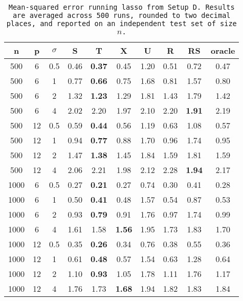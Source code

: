 \begin{table}[ht]
\centering
\begin{tabular}{cccccccccc}
  \hline
n & p & $\sigma$ & S & T & X & U & R & RS & oracle \\ 
  \hline
500 & 6 & 0.5 & 0.46 & \bf 0.37 & 0.45 & 1.20 & 0.51 & 0.72 & 0.47 \\ 
  500 & 6 & 1 & 0.77 & \bf 0.66 & 0.75 & 1.68 & 0.81 & 1.57 & 0.80 \\ 
  500 & 6 & 2 & 1.32 & \bf 1.23 & 1.29 & 1.81 & 1.43 & 1.79 & 1.42 \\ 
  500 & 6 & 4 & 2.02 & 2.20 & 1.97 & 2.10 & 2.20 & \bf 1.91 & 2.19 \\ 
  500 & 12 & 0.5 & 0.59 & \bf 0.44 & 0.56 & 1.19 & 0.63 & 1.08 & 0.57 \\ 
  500 & 12 & 1 & 0.94 & \bf 0.77 & 0.88 & 1.70 & 0.96 & 1.74 & 0.95 \\ 
  500 & 12 & 2 & 1.47 & \bf 1.38 & 1.45 & 1.84 & 1.59 & 1.81 & 1.59 \\ 
  500 & 12 & 4 & 2.06 & 2.21 & 1.98 & 2.12 & 2.28 & \bf 1.94 & 2.17 \\ 
  1000 & 6 & 0.5 & 0.27 & \bf 0.21 & 0.27 & 0.74 & 0.30 & 0.41 & 0.28 \\ 
  1000 & 6 & 1 & 0.50 & \bf 0.41 & 0.48 & 1.57 & 0.54 & 0.87 & 0.53 \\ 
  1000 & 6 & 2 & 0.93 & \bf 0.79 & 0.91 & 1.76 & 0.97 & 1.74 & 0.99 \\ 
  1000 & 6 & 4 & 1.61 & 1.58 & \bf 1.56 & 1.95 & 1.73 & 1.83 & 1.70 \\ 
  1000 & 12 & 0.5 & 0.35 & \bf 0.26 & 0.34 & 0.76 & 0.38 & 0.55 & 0.36 \\ 
  1000 & 12 & 1 & 0.61 & \bf 0.48 & 0.57 & 1.54 & 0.63 & 1.28 & 0.64 \\ 
  1000 & 12 & 2 & 1.10 & \bf 0.93 & 1.05 & 1.78 & 1.11 & 1.76 & 1.17 \\ 
  1000 & 12 & 4 & 1.76 & 1.73 & \bf 1.68 & 1.94 & 1.82 & 1.83 & 1.84 \\ 
   \hline
\end{tabular}
\caption{\tt Mean-squared error running \texttt{lasso} from Setup D. Results are averaged across 500 runs, rounded to two decimal places, and reported on an independent test set of size $n$.} 
\label{table:setup4}
\end{table}
